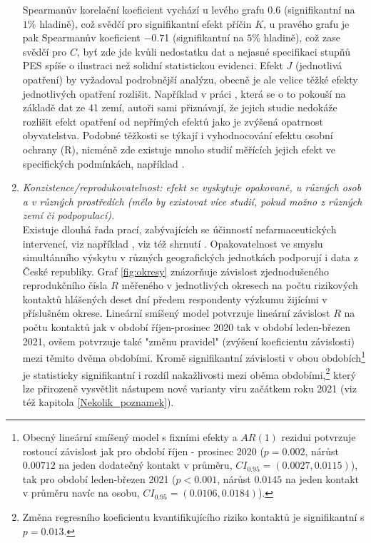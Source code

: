 \begin{enumerate}
Spearmanův korelační koeficient
vychází u levého grafu $0.6$ (signifikantní na $1\%$ hladině), což svědčí pro
signifikantní efekt příčin $K$, u pravého grafu je pak Spearmanův koeficient $-0.7$1 (signifikantní na $5$\% hladině), což zase svědčí pro $C$, byť zde jde kvůli nedostatku dat a nejasné specifikaci stupňů PES spíše o ilustraci než solidní statistickou evidenci. Efekt $J$ (jednotlivá opatření)
by vyžadoval podrobnější analýzu, obecně je ale velice těžké efekty
jednotlivých opatření rozlišit. Například v práci \cite{brauner2021inferring},
která se o to pokouší na základě dat ze 41 zemí, autoři sami přiznávají,
že jejich studie nedokáže rozlišit efekt opatření od nepřímých efektů
jako je zvýšená opatrnost obyvatelstva. Podobné těžkosti se týkají
i vyhodnocování efektu osobní ochrany (R), nicméně zde existuje mnoho
studií měřících jejich efekt ve specifických podmínkách, například \cite{chu2020physical}.
\item \emph{Konzistence/reprodukovatelnost: efekt se vyskytuje opakovaně,
u různých osob a v různých prostředích (mělo by existovat více studií,
pokud možno z různých zemí či podpopulací).}\\
Existuje dlouhá řada prací, zabývajících se 
účinností nefarmaceutických intervencí, viz například \cite{flaxman2020estimating},
viz též shrnutí \cite{kluveitOpat}. 
Opakovatelnost ve smyslu simultánního výskytu v různých geografických jednotkách podporují i data z České republiky. Graf \ref{fig:okresy} znázorňuje závislost zjednodušeného reprodukčního čísla $R$ měřeného v jednotlivých okresech na počtu rizikových kontaktů hlášených deset dní předem respondenty výzkumu \cite{paqcovid} žijícími v příslušném okrese. Lineární smíšený model potvrzuje lineární závislost $R$ na počtu kontaktů jak v období říjen-prosinec 2020 tak v období leden-březen 2021, ovšem potvrzuje také "změnu pravidel" (zvýšení koeficientu závislosti) mezi těmito dvěma obdobími. Kromě signifikantní závislosti v obou obdobích\footnote{Obecný lineární smíšený model s fixními efekty a $AR(1)$ rezidui potvrzuje rostoucí závislost jak pro období říjen - prosinec 2020 ($p=0.002$, nárůst $0.00712$ na jeden dodatečný kontakt v průměru, $CI_{0.95}=(0.0027,0.0115)$), tak pro období leden-březen 2021 ($p<0.001$, nárůst $0.0145$ na jeden kontakt v průměru navíc na osobu, $CI_{0.95}=(0.0106,0.0184)$).} je statisticky signifikantní i rozdíl nakažlivosti mezi oběma obdobími,\footnote{Změna regresního koeficientu kvantifikujícího riziko kontaktů je signifikantní s $p=0.013$.} který lze přirozeně vysvětlit nástupem nové varianty viru začátkem roku 2021 (viz též kapitola \ref{Nekolik_poznamek}).



\end{enumerate}
